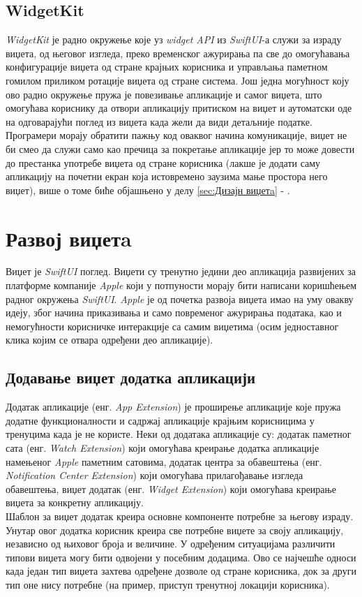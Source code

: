 \documentclass[12pt,oneside]{memoir}
\begin{document}
\subsection{WidgetKit}
\indent \textit{WidgetKit} је радно окружење које уз \textit{widget API} из  \textit{SwiftUI}-а служи за израду виџета, од његовог изгледа, преко временског ажурирања па све до омогућавања конфигурације виџета од стране крајњих корисника и управљања паметном гомилом приликом ротације виџета од стране система. Још једна могућност коју ово радно окружење пружа је повезивање апликације и самог виџета, што омогућава кориснику да отвори апликацију притиском на виџет и аутоматски оде на одговарајући поглед из виџета када жели да види детаљније податке. Програмери морају обратити пажњу код оваквог начина комуникације, виџет не би смео да служи само као пречица за покретање апликације јер то може довести до престанка употребе виџета од стране корисника (лакше је додати саму апликацију на почетни екран која истовремено заузима мање простора него виџет), више о томе биће објашњено у делу \ref{sec:Дизајн виџетa} - .

\section{Развој виџетa}
\label{sec:Развој виџетa}
\indent Виџет је \textit{SwiftUI} поглед. Виџети су тренутно једини део апликација развијених за платформе компаније \textit{Apple} који у потпуности морају бити написани коришћењем радног окружења \textit{SwiftUI}. \textit{Apple} је од почетка развоја виџета имао на уму овакву идеју, због начина приказивања и само повременог ажурирања података, као и немогућности корисничке интеракције са самим виџетима (осим једноставног клика којим се отвара одређени део апликације).

\subsection{Додавање виџет додатка апликацији}
\indent Додатак апликације (енг. \textit{App Extension}) је проширење апликације које пружа додатне функционалности и садржај апликације крајњим корисницима у тренуцима када је не користе. Неки од додатака апликације су: додатак паметног сата (енг. \textit{Watch Extension}) који омогућава креирање додатка апликације намењеног \textit{Apple} паметним сатовима, додатак центра за обавештења (енг. \textit{Notification Center Extension}) који омогућава прилагођавање изгледа обавештења, виџет додатак (енг. \textit{Widget Extension}) који омогућава креирање виџета за конкретну апликацију.
\\
\indent Шаблон за виџет додатак креира основне компоненте потребне за његову израду. Унутар овог додатка корисник креира све потребне виџете за своју апликацију, независно од њиховог броја и величине. У одређеним ситуацијама различити типови виџета могу бити одвојени у посебним додацима. Ово се најчешће односи када један тип виџета захтева одређене дозволе од стране корисника, док за други тип оне нису потребне (на пример, приступ тренутној локацији корисника).
\end{document}
